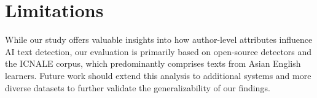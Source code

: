 \section*{Limitations}
While our study offers valuable insights into how author-level attributes influence AI text detection, our evaluation is primarily based on open-source detectors and the ICNALE corpus, which predominantly comprises texts from Asian English learners. Future work should extend this analysis to additional systems and more diverse datasets to further validate the generalizability of our findings.
